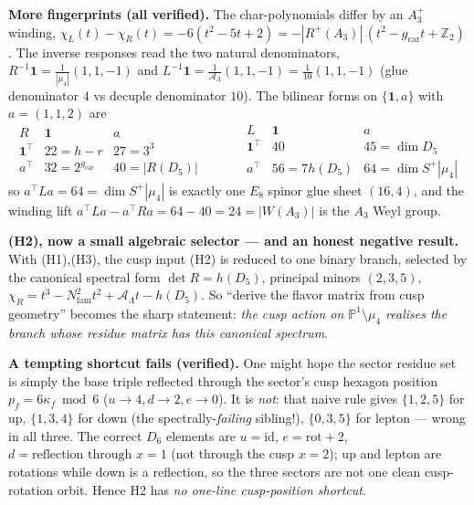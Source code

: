 \documentclass[11pt,a4paper]{article}
\newcommand{\gcar}{g_{\mathrm{car}}}
\newcommand{\Nfam}{N_{\mathrm{fam}}}
\newcommand{\AL}{\mathcal A_\Lambda}
\theoremstyle{definition}
\begin{document}
\smallskip
\noindent\textbf{More fingerprints (all verified).} The char-polynomials differ by an $A_3^+$ winding,
$\chi_L(t)-\chi_R(t)=-6(t^2-5t+2)=-|R^+(A_3)|\,(t^2-\gcar t+\mathbb Z_2)$. The inverse responses read the
two natural denominators, $R^{-1}\mathbf 1=\tfrac1{|\mu_4|}(1,1,-1)$ and
$L^{-1}\mathbf 1=\tfrac1{\AL}(1,1,-1)=\tfrac1{10}(1,1,-1)$ (glue denominator $4$ vs decuple denominator
$10$). The bilinear forms on $\{\mathbf 1,a\}$ with $a=(1,1,2)$ are
\begin{equation}
  \begin{array}{c|cc}
  R & \mathbf 1 & a\\\hline
  \mathbf 1^{\!\top} & 22=h{-}r & 27=3^3\\
  a^{\!\top} & 32=2^{\gcar} & 40=|R(D_5)|
  \end{array}
  \qquad\quad
  \begin{array}{c|cc}
  L & \mathbf 1 & a\\\hline
  \mathbf 1^{\!\top} & 40 & 45=\dim D_5\\
  a^{\!\top} & 56=7h(D_5) & 64=\dim S^+|\mu_4|
  \end{array}
\end{equation}
so $a^{\!\top}La=64=\dim S^+|\mu_4|$ is exactly one $E_8$ spinor glue sheet $(16,4)$, and the winding lift
$a^{\!\top}La-a^{\!\top}Ra=64-40=24=|W(A_3)|$ is the $A_3$ Weyl group. \mE
\par\smallskip\noindent\textbf{(H2), now a small algebraic selector --- and an honest negative result.}
With (H1),(H3), the cusp input (H2) is reduced to one binary branch, selected by the canonical spectral
form $\det R=h(D_5)$, principal minors $(2,3,5)$, $\chi_R=t^3-\Nfam^2t^2+\AL t-h(D_5)$. So ``derive the
flavor matrix from cusp geometry'' becomes the sharp statement: \emph{the cusp action on
$\mathbb P^1\setminus\mu_4$ realises the branch whose residue matrix has this canonical spectrum}.

\smallskip
\noindent\textbf{A tempting shortcut fails (verified).} One might hope the sector residue set is simply
the base triple reflected through the sector's cusp hexagon position $p_f=6\kappa_f\bmod 6$
($u\!\to\!4,d\!\to\!2,e\!\to\!0$). It is \emph{not}: that naive rule gives $\{1,2,5\}$ for up,
$\{1,3,4\}$ for down (the spectrally-\emph{failing} sibling!), $\{0,3,5\}$ for lepton --- wrong in all
three. The correct $D_6$ elements are $u=\mathrm{id}$, $e=\text{rot}+2$, $d=\text{reflection through }x{=}1$
(not through the cusp $x{=}2$); up and lepton are rotations while down is a reflection, so the three
sectors are not one clean cusp-rotation orbit. Hence H2 has \emph{no one-line cusp-position shortcut}.
\end{document}
